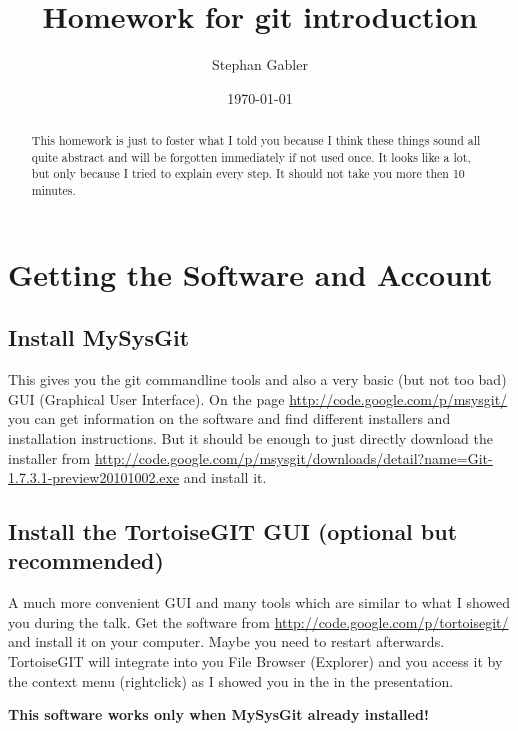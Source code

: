 \documentclass[]{article}
\title{Homework for git introduction}
\author{Stephan Gabler}
\date{\today}
\begin{document}
\ifpdf
{}
\else
{}
\fi

\maketitle

\begin{abstract}
    This homework is just to foster what I told you because I think these things sound all quite abstract and will be forgotten immediately if not used once. It looks like a lot, but only because I tried to explain every step. It should not take you more then 10 minutes.
\end{abstract}

\section{Getting the Software and Account}

\subsection{Install MySysGit} %
\label{sg:sub:install_mysysgit}
This gives you the git commandline tools and also a very basic (but not too bad) GUI (Graphical User Interface). On the page \url{http://code.google.com/p/msysgit/} you can get information on the software and find different installers and installation instructions. But it should be enough to just directly download the installer from \url{http://code.google.com/p/msysgit/downloads/detail?name=Git-1.7.3.1-preview20101002.exe} and install it.



\subsection{Install the TortoiseGIT GUI (optional but recommended)} %
\label{sg:sub:install_the_tortoisegit_gui_optional_}
A much more convenient GUI and many tools which are similar to what I showed you during the talk. Get the software from \url{http://code.google.com/p/tortoisegit/} and install it on your computer. Maybe you need to restart afterwards. TortoiseGIT will integrate into you File Browser (Explorer) and you access it by the context menu (rightclick) as I showed you in the in the presentation.

\textbf{This software works only when MySysGit already installed!}
\end{document}
